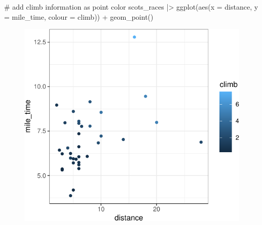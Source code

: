 \documentclass[
  11pt,
  letterpaper,
  oneside]{book}
\newenvironment{Shaded}{\begin{snugshade}}{\end{snugshade}}
\newcommand{\AttributeTok}[1]{\textcolor[rgb]{0.40,0.45,0.13}{#1}}
\newcommand{\CommentTok}[1]{\textcolor[rgb]{0.37,0.37,0.37}{#1}}
\newcommand{\FunctionTok}[1]{\textcolor[rgb]{0.28,0.35,0.67}{#1}}
\newcommand{\NormalTok}[1]{\textcolor[rgb]{0.00,0.23,0.31}{#1}}
\newcommand{\SpecialCharTok}[1]{\textcolor[rgb]{0.37,0.37,0.37}{#1}}
\theoremstyle{plain}
\theoremstyle{plain}
\theoremstyle{definition}
\theoremstyle{definition}
\theoremstyle{plain}
\theoremstyle{remark}
\begin{document}
\begin{Shaded}
\begin{Highlighting}[]
\CommentTok{\# add climb information as point color}
\NormalTok{scots\_races }\SpecialCharTok{|\textgreater{}}
  \FunctionTok{ggplot}\NormalTok{(}\FunctionTok{aes}\NormalTok{(}\AttributeTok{x =}\NormalTok{ distance, }\AttributeTok{y =}\NormalTok{ mile\_time, }\AttributeTok{colour =}\NormalTok{ climb)) }\SpecialCharTok{+}
  \FunctionTok{geom\_point}\NormalTok{()}
\end{Highlighting}
\end{Shaded}

\begin{figure}[H]

{\centering \includegraphics{r-demo-part-1_files/figure-pdf/unnamed-chunk-6-1.pdf}

}

\end{figure}
\end{document}
